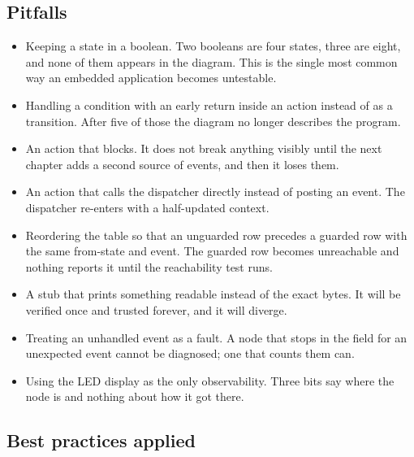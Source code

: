 \subsection*{Pitfalls}

\begin{itemize}
\item Keeping a state in a boolean. Two booleans are four states, three are
eight, and none of them appears in the diagram. This is the single most common
way an embedded application becomes untestable.
\item Handling a condition with an early return inside an action instead of as
a transition. After five of those the diagram no longer describes the program.
\item An action that blocks. It does not break anything visibly until the next
chapter adds a second source of events, and then it loses them.
\item An action that calls the dispatcher directly instead of posting an event.
The dispatcher re-enters with a half-updated context.
\item Reordering the table so that an unguarded row precedes a guarded row with
the same from-state and event. The guarded row becomes unreachable and nothing
reports it until the reachability test runs.
\item A stub that prints something readable instead of the exact bytes. It will
be verified once and trusted forever, and it will diverge.
\item Treating an unhandled event as a fault. A node that stops in the field
for an unexpected event cannot be diagnosed; one that counts them can.
\item Using the LED display as the only observability. Three bits say where the
node is and nothing about how it got there.
\end{itemize}

\subsection*{Best practices applied}

